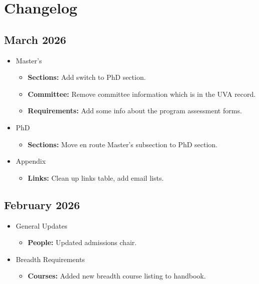 \newpage

\section*{Changelog}

\subsection*{March 2026}
\begin{itemize}[nosep]
  \item Master's
  \begin{itemize}[nosep]
    \item \textbf{Sections:} Add switch to PhD section.
    \item \textbf{Committee:} Remove committee information which is in the UVA record.
    \item \textbf{Requirements:} Add some info about the program assessment forms.
  \end{itemize}
  \item PhD
  \begin{itemize}[nosep]
    \item \textbf{Sections:} Move en route Master's subsection to PhD section.
  \end{itemize}
  \item Appendix
  \begin{itemize}[nosep]
    \item \textbf{Links:} Clean up links table, add email lists.
  \end{itemize}
\end{itemize}

\subsection*{February 2026}
\begin{itemize}[nosep]
  \item General Updates
  \begin{itemize}[nosep]
    \item \textbf{People:} Updated admissions chair.
  \end{itemize}
  \item Breadth Requirements
  \begin{itemize}[nosep]
    \item \textbf{Courses:} Added new breadth course listing to handbook.
  \end{itemize}
\end{itemize}


